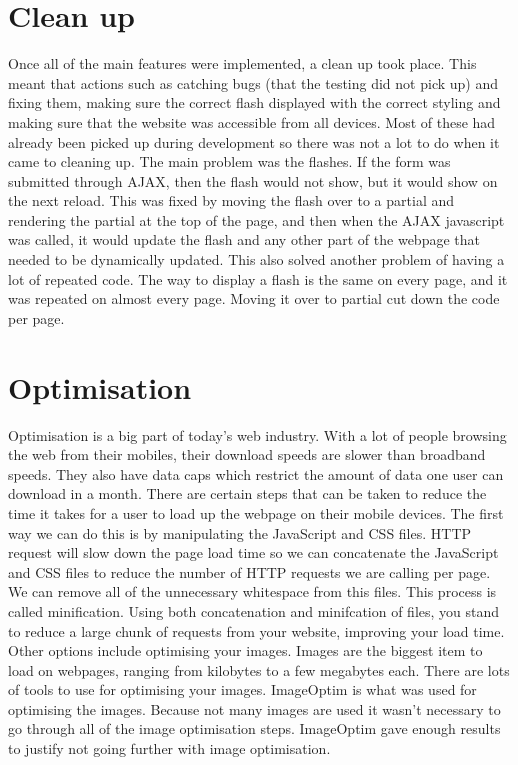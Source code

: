 \section{Clean up}
Once all of the main features were implemented, a clean up took place. This meant that actions such as catching bugs (that the testing did not pick up) and fixing them, making sure the correct flash displayed with the correct styling and making sure that the website was accessible from all devices. Most of these had already been picked up during development so there was not a lot to do when it came to cleaning up. The main problem was the flashes. If the form was submitted through AJAX, then the flash would not show, but it would show on the next reload. This was fixed by moving the flash over to a partial and rendering the partial at the top of the page, and then when the AJAX javascript was called, it would update the flash and any other part of the webpage that needed to be dynamically updated. This also solved another problem of having a lot of repeated code. The way to display a flash is the same on every page, and it was repeated on almost every page. Moving it over to partial cut down the code per page.\\

\section{Optimisation}
Optimisation is a big part of today's web industry. With a lot of people browsing the web from their mobiles, their download speeds are slower than broadband speeds. They also have data caps which restrict the amount of data one user can download in a month. There are certain steps that can be taken to reduce the time it takes for a user to load up the webpage on their mobile devices. The first way we can do this is by manipulating the JavaScript and CSS files. HTTP  request will slow down the page load time so we can concatenate the JavaScript and CSS files to reduce the number of HTTP requests we are calling per page. We can remove all of the unnecessary whitespace from this files. This process is called minification. Using both concatenation and minifcation of files, you stand to reduce a large chunk of requests from your website, improving your load time. Other options include optimising your images. Images are the biggest item to load on webpages, ranging from kilobytes to a few megabytes each. There are lots of tools to use for optimising your images. ImageOptim \citep{imageoptim:2014} is what was used for optimising the images. Because not many images are used it wasn't necessary to go through all of the image optimisation steps. ImageOptim gave enough results to justify not going further with image optimisation.\\


